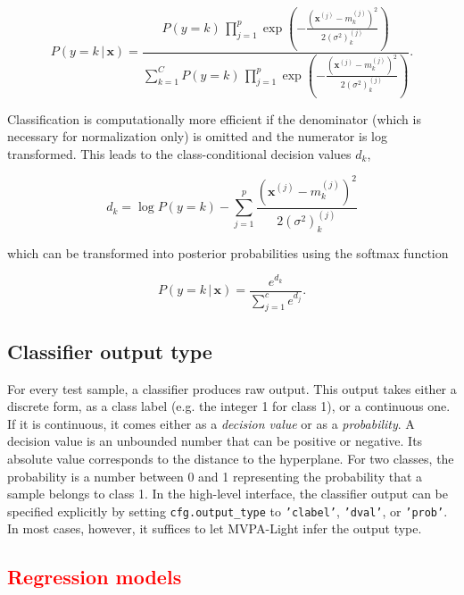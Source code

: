 \documentclass[utf8]{frontiersSCNS} %
\newcommand{\mf}[2]{m_#1^{(#2)}}
\newcommand{\sig}[2]{(\sigma^2)_#1^{(#2)}}
\newcommand{\x}{\mathbf{x}}
\newcommand{\xf}[1]{\mathbf{x}^{(#1)}} %
\newcommand{\ttt}[1]{\texttt{#1}}
\newcommand{\red}[1]{\textcolor{red}{#1}}
\begin{document}
\begin{equation}
\label{eq:naive_bayes_gaussian}
P(y = k\,|\,\x) = \frac{P(y = k)\,\prod_{j=1}^p \exp(-\frac{(\xf{j} - \mf{k}{j})^2}{2\sig{k}{j}})}%
{\sum_{k=1}^C P(y = k)\,\prod_{j=1}^p \exp(-\frac{(\xf{j} - \mf{k}{j})^2}{2\sig{k}{j}})}.
\end{equation}

Classification is computationally more efficient if the denominator (which is necessary for normalization only) is omitted and the numerator is log transformed. This leads to the class-conditional decision values $d_k$,

\begin{equation}
\label{eq:naive_bayes_dval}
d_k = \log P(y = k) - \sum_{j=1}^p \frac{(\xf{j} - \mf{k}{j})^2}{2\sig{k}{j}}
\end{equation}

which can be transformed into posterior probabilities using the softmax function 

\begin{equation}
\label{eq:naive_bayes_softmax}
P(y = k\,|\,\x) = \frac{e^{d_k}}{\sum_{j=1}^c e^{d_j}}.
\end{equation}

\subsection{Classifier output type}\label{sec:output}

For every test sample, a classifier produces raw output. This output takes either a discrete form, as a class label (e.g. the integer 1 for class 1), or a continuous one. If it is continuous, it comes either as a \textit{decision value} or as a \textit{probability}. A decision value is an unbounded number that can be positive or negative. Its absolute value corresponds to the distance to the hyperplane. For two classes, the probability is a number between 0 and 1 representing the probability that a sample belongs to class 1. 
In the high-level interface, the classifier output can be specified explicitly by setting \ttt{cfg.output\_type} to \ttt{'clabel'}, \ttt{'dval'}, or \ttt{'prob'}. In most cases, however, it suffices to let MVPA-Light infer the output type.

\red{\subsection{Regression models}\label{sec:regression}}
\end{document}
